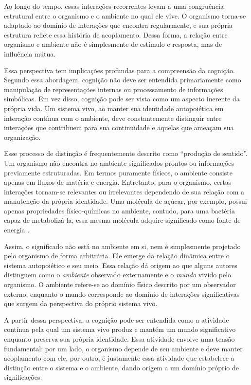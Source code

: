 Ao longo do tempo, essas interações recorrentes levam a uma congruência estrutural entre o organismo e o ambiente no qual ele vive. O organismo torna-se adaptado ao domínio de interações que encontra regularmente, e sua própria estrutura reflete essa história de acoplamento. Dessa forma, a relação entre organismo e ambiente não é simplesmente de estímulo e resposta, mas de influência mútua.

Essa perspectiva tem implicações profundas para a compreensão da cognição. Segundo essa abordagem, cognição não deve ser entendida primariamente como manipulação de representações internas ou processamento de informações simbólicas. Em vez disso, cognição pode ser vista como um aspecto inerente da própria vida. Um sistema vivo, ao manter sua identidade autopoiética em interação contínua com o ambiente, deve constantemente distinguir entre interações que contribuem para sua continuidade e aquelas que ameaçam sua organização.

Esse processo de distinção é frequentemente descrito como ``produção de sentido''. Um organismo não encontra no ambiente significados prontos ou informações previamente estruturadas. Em termos puramente físicos, o ambiente consiste apenas em fluxos de matéria e energia. Entretanto, para o organismo, certas interações tornam-se relevantes ou irrelevantes dependendo de sua relação com a manutenção da própria identidade. Uma molécula de açúcar, por exemplo, possui apenas propriedades físico-químicas no ambiente, contudo, para uma bactéria capaz de metabolizá-la, essa mesma molécula adquire significado como fonte de energia \cite{varela1991intentionality}.

Assim, o significado não está no ambiente em si, nem é simplesmente projetado pelo organismo de forma arbitrária. Ele emerge da relação dinâmica entre o sistema autopoiético e seu meio. Essa relação dá origem ao que alguns autores distinguem como o \textit{ambiente} observado externamente e o \textit{mundo} vivido pelo organismo. O ambiente refere-se ao domínio físico descrito por um observador externo, enquanto o mundo corresponde ao domínio de interações significativas que surgem da perspectiva do próprio sistema vivo.

A partir dessa perspectiva, a cognição pode ser entendida como a atividade contínua pela qual um sistema vivo produz e mantém um mundo significativo enquanto preserva sua própria identidade. Essa atividade envolve uma tensão fundamental: por um lado, o organismo depende de seu ambiente e deve manter acoplamento com ele, por outro, é justamente essa atividade que estabelece a distinção entre o sistema e o ambiente, dando origem a um domínio próprio de significações.

